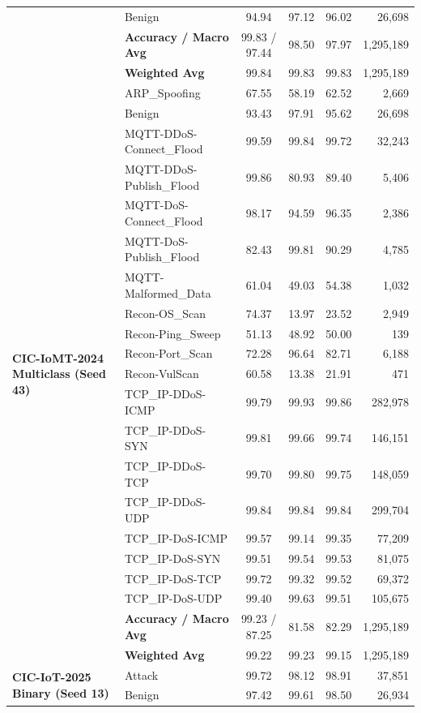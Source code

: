 \documentclass[a4paper,fleqn]{cas-sc}
\begin{document}
{\begin{longtable}{llcccr}
 & Benign & 94.94 & 97.12 & 96.02 & 26,698 \\
 & \textbf{Accuracy / Macro Avg} & 99.83 / 97.44 & 98.50 & 97.97 & 1,295,189 \\
 & \textbf{Weighted Avg} & 99.84 & 99.83 & 99.83 & 1,295,189 \\
\midrule
\multirow{21}{*}{\textbf{CIC-IoMT-2024 Multiclass (Seed 43)}} & ARP\_Spoofing & 67.55 & 58.19 & 62.52 & 2,669 \\
 & Benign & 93.43 & 97.91 & 95.62 & 26,698 \\
 & MQTT-DDoS-Connect\_Flood & 99.59 & 99.84 & 99.72 & 32,243 \\
 & MQTT-DDoS-Publish\_Flood & 99.86 & 80.93 & 89.40 & 5,406 \\
 & MQTT-DoS-Connect\_Flood & 98.17 & 94.59 & 96.35 & 2,386 \\
 & MQTT-DoS-Publish\_Flood & 82.43 & 99.81 & 90.29 & 4,785 \\
 & MQTT-Malformed\_Data & 61.04 & 49.03 & 54.38 & 1,032 \\
 & Recon-OS\_Scan & 74.37 & 13.97 & 23.52 & 2,949 \\
 & Recon-Ping\_Sweep & 51.13 & 48.92 & 50.00 & 139 \\
 & Recon-Port\_Scan & 72.28 & 96.64 & 82.71 & 6,188 \\
 & Recon-VulScan & 60.58 & 13.38 & 21.91 & 471 \\
 & TCP\_IP-DDoS-ICMP & 99.79 & 99.93 & 99.86 & 282,978 \\
 & TCP\_IP-DDoS-SYN & 99.81 & 99.66 & 99.74 & 146,151 \\
 & TCP\_IP-DDoS-TCP & 99.70 & 99.80 & 99.75 & 148,059 \\
 & TCP\_IP-DDoS-UDP & 99.84 & 99.84 & 99.84 & 299,704 \\
 & TCP\_IP-DoS-ICMP & 99.57 & 99.14 & 99.35 & 77,209 \\
 & TCP\_IP-DoS-SYN & 99.51 & 99.54 & 99.53 & 81,075 \\
 & TCP\_IP-DoS-TCP & 99.72 & 99.32 & 99.52 & 69,372 \\
 & TCP\_IP-DoS-UDP & 99.40 & 99.63 & 99.51 & 105,675 \\
 & \textbf{Accuracy / Macro Avg} & 99.23 / 87.25 & 81.58 & 82.29 & 1,295,189 \\
 & \textbf{Weighted Avg} & 99.22 & 99.23 & 99.15 & 1,295,189 \\
\midrule
\multirow{4}{*}{\textbf{CIC-IoT-2025 Binary (Seed 13)}} & Attack & 99.72 & 98.12 & 98.91 & 37,851 \\
 & Benign & 97.42 & 99.61 & 98.50 & 26,934 \\

\end{longtable}}
\end{document}

